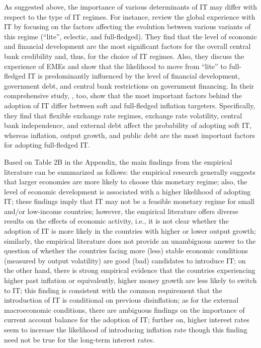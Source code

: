 \documentclass{article}
\begin{document}
As suggested above, the importance of various determinants of IT may differ with respect to the type of IT regimes. For instance, \citet{carare2006} review the global experience with IT by focusing on the factors affecting the evolution between various variants of this regime (“lite”, eclectic, and full-fledged). They find that the level of economic and financial development are the most significant factors for the overall central bank credibility and, thus, for the choice of IT regimes. Also, they discuss the experience of EMEs and show that the likelihood to move from “lite” to full-fledged IT is predominantly influenced by the level of financial development, government debt, and central bank restrictions on government financing. In their comprehensive study, \citet{samarina2014}, too, show that the most important factors behind the adoption of IT differ between soft and full-fledged inflation targeters. Specifically, they find that flexible exchange rate regimes, exchange rate volatility, central bank independence, and external debt affect the probability of adopting soft IT, whereas inflation, output growth, and public debt are the most important factors for adopting full-fledged IT.

Based on Table 2B in the Appendix, the main findings from the empirical literature can be summarized as follows: the empirical research generally suggests that larger economies are more likely to choose this monetary regime; also, the level of economic development is associated with a higher likelihood of adopting IT; these findings imply that IT may not be a feasible monetary regime for small and/or low-income countries; however, the empirical literature offers diverse results on the effects of economic activity, i.e., it is not clear whether the adoption of IT is more likely in the countries with higher or lower output growth; similarly, the empirical literature does not provide an unambiguous answer to the question of whether the countries facing more (less) stable economic conditions (measured by output volatility) are good (bad) candidates to introduce IT; on the other hand, there is strong empirical evidence that the countries experiencing higher past inflation or equivalently, higher money growth are less likely to switch to IT; this finding is consistent with the common requirement that the introduction of IT is conditional on previous disinflation; as for the external macroeconomic conditions, there are ambiguous findings on the importance of current account balance for the adoption of IT; further on, higher interest rates seem to increase the likelihood of introducing inflation rate though this finding need not be true for the long-term interest rates.
\end{document}
